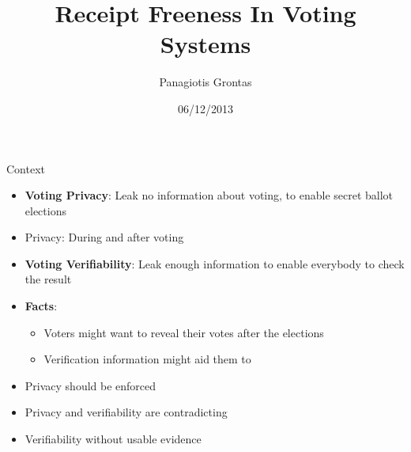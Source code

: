\documentclass{beamer}
\title{Receipt Freeness In Voting Systems}
\author{Panagiotis Grontas}
\date{06/12/2013}
\institute{$\mu\Pi\lambda\forall$  - CoReLab Crypto Group}
\begin{document}
\begin{frame}
\titlepage
\end{frame}

\begin{frame}{Context}

\begin{itemize}
\item \textbf{Voting Privacy}: Leak no information about voting, to enable secret ballot elections
\item Privacy: During and after voting
\item\textbf{Voting Verifiability}: Leak enough information to enable everybody to check the result
\item \textbf{Facts}:
\begin{itemize}
	\item Voters might want to reveal their votes after the elections
	\item Verification information might aid them to
\end{itemize}
\item Privacy should be enforced
\item Privacy and verifiability are contradicting
\item Verifiability without usable evidence
\end{itemize}

\end{frame}
\end{document}
